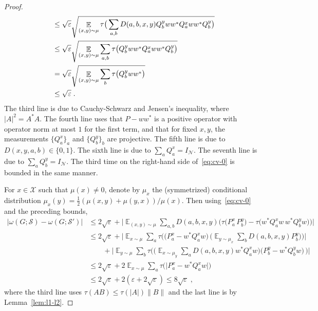 \documentclass[11pt]{article}
\theoremstyle{definition}
\newcommand{\strategy}{\mathscr{S}}
\DeclareMathOperator*{\Expectation}{\mathbb{E}}
\newcommand{\Es}[1]{\Expectation_{#1}}
\newcommand{\mX}{\ensuremath{\mathcal{X}}}
\newcommand{\eps}{\varepsilon}
\newcommand{\mN}{\mathcal{N}}
\begin{document}
\begin{proof}
\begin{align}
&\leq \sqrt{\eps}\sqrt{ \Es{(x,y)\sim\mu} \tau\big( \sum_{a,b} D(a,b,x,y)   Q^y_b ww^* Q^x_a w w^* Q^y_b \big) } \notag\\
&\leq \sqrt{\eps}\sqrt{ \Es{(x,y)\sim\mu}  \sum_{a,b}  \tau\big(Q^y_b ww^* Q^x_a w w^* Q^y_b \big) } \notag \\
&=\sqrt{\eps}\sqrt{ \Es{(x,y)\sim\mu}  \sum_{b}  \tau\big(Q^y_b ww^* \big) } \notag\\
&\leq \sqrt{\eps}\;.\label{eq:cv-1}
\end{align}
The third line is due to Cauchy-Schwarz and Jensen's inequality, where $|A|^2=A^*A$. The fourth line uses that $P - ww^*$ is a positive operator with operator norm at most $1$ for the first term, and that for fixed $x,y$, the measurements $\{ Q^x_a \}_a$ and $\{Q^y_b\}_b$ are projective. The fifth line is due to $D(x,y,a,b) \in \{0,1\}$. The sixth line is due to $\sum_a Q^x_a = I_\mN$. The seventh line is due to $\sum_a Q^y_b = I_\mN$. The third time on the right-hand side of~\eqref{eq:cv-0} is bounded in the same manner. 

For $x\in \mX$ such that $\mu(x)\neq 0$, denote by $\mu_x$ the (symmetrized) conditional distribution $\mu_x(y)=\frac{1}{2}(\mu(x,y)+\mu(y,x))/\mu(x)$. Then using~\eqref{eq:cv-0} and the preceding bounds,
\begin{align*}
\big|\omega(G;\strategy) - \omega(G;\strategy')\big|
 &\leq 2\sqrt{\eps}+ \Big|\Es{(x,y)\sim\mu} \sum_{a,b} D(a,b,x,y) \big( \tau\big( P^x_a \, P^y_b \big)-\tau\big( w^* Q^x_a w\, w^* Q^y_b w\big)\big)\Big|\\
&\leq  2\sqrt{\eps}+ \Big|\Es{x\sim\mu} \sum_{a}  \tau\Big( \big(P^x_a-w^* Q^x_aw\big) \, \Big( \Es{y\sim \mu_x} \sum_b D(a,b,x,y) P^y_b \Big)\Big)\Big|\\
&\qquad+ \Big|\Es{y\sim\mu} \sum_{b}  \tau\Big(\Big( \Es{x\sim \mu_y} \sum_a D(a,b,x,y) w^* Q^x_a w\Big) \big(P^y_b-w^*Q^y_bw\big) \, \Big)\Big|\\
&\leq 2\sqrt{\eps}+2\Es{x\sim\mu} \sum_{a}  \tau\big(\big| P^x_a-w^*Q^x_aw\big|\big) \\
&\leq 2\sqrt{\eps}+2(\eps + 2\sqrt{\eps}) \leq 8\sqrt{\eps}\;,
\end{align*}
where the third line uses $\tau(AB)\leq\tau(|A|)\|B\|$ and the last line is by Lemma~\ref{lem:l1-l2}.%
\end{proof}
	
\end{document}
